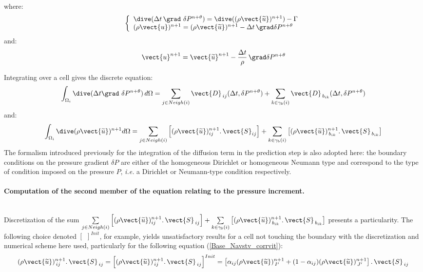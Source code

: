 where:
\begin{equation}
\left\{\begin{array}{l}
\dive(\Delta t\, \grad\ \delta P^{n+\theta})=\dive((\rho \vect{\widetilde{u}})^{n+1})-\Gamma\\
(\rho\vect{u})^{n+1} = (\rho\vect{\widetilde{u}})^{n+1}-\Delta t\, \grad \delta P^{n+\theta}
\end{array}\right.
\end{equation}
and:
\begin{equation}
\label{Base_Navstv_corrvit}
\vect{u}^{n+1} = \vect{\widetilde{u}}^{n+1}-\frac{\Delta t}{\rho}\, \grad\delta
P^{n+\theta}
\end{equation}

Integrating over a cell gives the discrete equation:
\begin{equation}
\int_{\Omega_i}{\dive(\Delta t \grad\ \delta P^{n+\theta})\, d\Omega} =
\sum\limits_{j\in Neigh(i)}{\vect{D}_{\,ij}(\Delta t, \delta P^{n+\theta})}
+\sum_{k\in {\gamma_b(i)}} {\vect{D}_{\,{b}_{ik}}(\Delta t, \delta P^{n+\theta})}
\label{Base_Navstv_eq_correction_discrete}
\end{equation}
and:
\begin{equation}
\int_{\Omega_i}{\dive(\rho \vect{\widetilde{u}})^{n+1}  d\Omega} =
\sum_{j\in Neigh{(i)}}{\left[ (\rho
\vect{\widetilde{u}})^{n+1}_{ij}\text{.}\,\vect{S}_{ij}\right]}
+\sum_{k\in {\gamma_b(i)}} \left[{(\rho \vect{\widetilde{u}})^{n+1}_{\,{b}_{ik}}} \text{.}\, \vect{S}_{\,{b}_{ik}}\right]
\end{equation}
The formalism introduced previously for the integration of the diffusion term in
the prediction step is also adopted here: the boundary conditions on the
pressure gradient $\delta P$ are either of the homogeneous Dirichlet or
homogeneous Neumann type and correspond to the type of condition imposed
on the pressure $P$, {\it i.e.} a Dirichlet or Neumann-type condition
respectively.

\paragraph{\bf Computation of the second member of the equation relating to the
pressure increment.\\\\ }

Discretization of the sum $\sum\limits_{j\in Neigh{(i)}}{\left[ (\rho
\vect{\widetilde{u}})^{n+1}_{ij}\text{.}\,\vect{S}_{\,ij}\right]} +
\sum\limits_{k\in {\gamma_b(i)}} \left[{(\rho \vect{\widetilde{u}})^{n+1}_{\,{b}_{ik}}} \text{.}\, \vect{S}_{\,{b}_{ik}}\right]$ presents a particularity. The following choice denoted $\left[{\ \ }\right]^{Init}$, for example, yields unsatisfactory results for a cell not touching the boundary with the discretization and numerical scheme here used, particularly for the following equation
(\ref{Base_Navstv_corrvit}):
\begin{equation}
(\rho \vect{\widetilde{u}})^{n+1}_{\,ij}.\,\vect{S}_{\,ij}=
\left[(\rho \vect{\widetilde{u}})^{n+1}_{\,ij}.\,\vect{S}_{\,ij}\right]^{Init}=
\left[\alpha_{ij} (\rho\vect{\widetilde{u}})^{n+1}_{\,I'} +
(1-\alpha_{ij}) (\rho\vect{\widetilde{u}})^{n+1}_{\,J'}\right].\,\vect{S}_{\,ij}
\end{equation}

